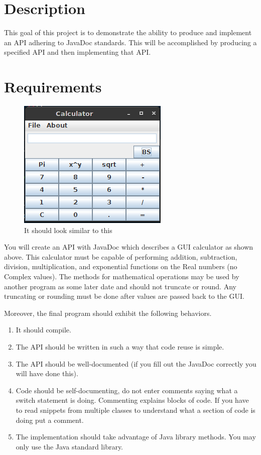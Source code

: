 \documentclass[]{simple}
\begin{document}
\section{Description}
This goal of this project is to demonstrate the ability to produce and implement an API adhering to JavaDoc standards.
This will be accomplished by producing a specified API and then implementing that API.
\section{Requirements}
\begin{figure}[h!]
\centering
\includegraphics[scale=0.5]{gui.png}
\caption{It should look similar to this}
\end{figure}
You will create an API with JavaDoc which describes a GUI calculator as shown above.
This calculator must be capable of performing addition, subtraction, division, multiplication, and exponential functions on the Real numbers (no Complex values).
The methods for mathematical operations may be used by another program as some later date and should not truncate or round.
Any truncating or rounding must be done after values are passed back to the GUI.

Moreover, the final program should exhibit the following behaviors.
\begin{enumerate}
	\item It should compile.
	\item The API should be written in such a way that code reuse is simple.
	\item The API should be well-documented (if you fill out the JavaDoc correctly you will have done this).
	\item Code should be self-documenting, do not enter comments saying what a switch statement is doing.
	Commenting explains blocks of code.
	If you have to read snippets from multiple classes to understand what a section of code is doing put a comment.
	\item The implementation should take advantage of Java library methods. You may only use the Java standard library.
\end{enumerate}
\end{document}
